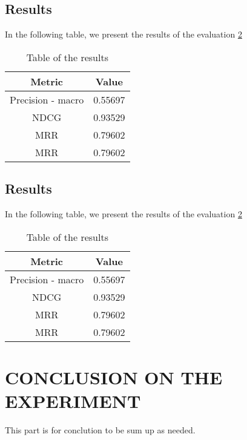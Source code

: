 \documentclass[11pt]{article}
\begin{document}
\subsection{Results}\label{sec:results}
In the following table, we present the results of the evaluation \ref{tab:results_table}
\begin{table}[!hbp]\label{tab:results_table}
    \centering
  \begin{tabular}{|c|c|}
    \hline
    \textbf{Metric}& \textbf{Value} \\ \hline
        Precision - macro & 0.55697\\ \hline
                                        NDCG  & 0.93529\\ \hline
            MRR  & 0.79602\\ \hline
                        MRR & 0.79602\\ \hline
                  \end{tabular}
  \caption{Table of the results}
\end{table}
\hfill\break
\hfill\break



\subsection{Results}\label{sec:results}
In the following table, we present the results of the evaluation \ref{tab:results_table}
\begin{table}[!hbp]\label{tab:results_table}
    \centering
  \begin{tabular}{|c|c|}
    \hline
    \textbf{Metric}& \textbf{Value} \\ \hline
        Precision - macro & 0.55697\\ \hline
                                        NDCG  & 0.93529\\ \hline
            MRR  & 0.79602\\ \hline
                        MRR & 0.79602\\ \hline
                  \end{tabular}
  \caption{Table of the results}
\end{table}
\hfill\break
\hfill\break







\section{CONCLUSION ON THE EXPERIMENT}\label{sec:conclution}
This part is for conclution to be sum up as needed.
\hfill\break
\hfill\break

\end{document}
